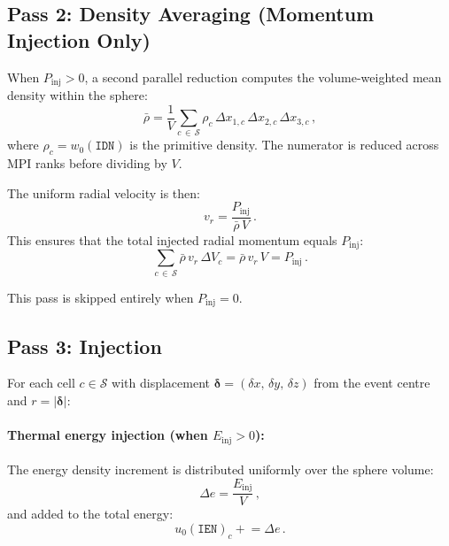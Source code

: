 \documentclass[11pt]{article}
\begin{document}
\subsection{Pass 2: Density Averaging (Momentum Injection Only)}

When $P_\mathrm{inj} > 0$, a second parallel reduction computes the
volume-weighted mean density within the sphere:
\begin{equation}
  \bar{\rho} = \frac{1}{V} \sum_{c \,\in\, \mathcal{S}} \rho_c \,\Delta x_{1,c}\,\Delta x_{2,c}\,\Delta x_{3,c}\,,
\end{equation}
where $\rho_c = w_0(\texttt{IDN})$ is the primitive density.  The numerator is
reduced across MPI ranks before dividing by $V$.

The uniform radial velocity is then:
\begin{equation}\label{eq:vri}
  v_r = \frac{P_\mathrm{inj}}{\bar{\rho}\,V}\,.
\end{equation}
This ensures that the total injected radial momentum equals
$P_\mathrm{inj}$:
\begin{equation}
  \sum_{c \,\in\, \mathcal{S}} \bar{\rho}\,v_r\,\Delta V_c = \bar{\rho}\,v_r\,V = P_\mathrm{inj}\,.
\end{equation}

This pass is skipped entirely when $P_\mathrm{inj} = 0$.

\subsection{Pass 3: Injection}

For each cell $c \in \mathcal{S}$ with displacement
$\boldsymbol{\delta} = (\delta x,\, \delta y,\, \delta z)$ from the event
centre and $r = |\boldsymbol{\delta}|$:

\paragraph{Thermal energy injection (when $E_\mathrm{inj} > 0$):}
The energy density increment is distributed uniformly over the sphere volume:
\begin{equation}
  \Delta e = \frac{E_\mathrm{inj}}{V}\,,
\end{equation}
and added to the total energy:
\begin{equation}
  u_0(\texttt{IEN})_c \mathrel{+}= \Delta e\,.
\end{equation}
\end{document}
